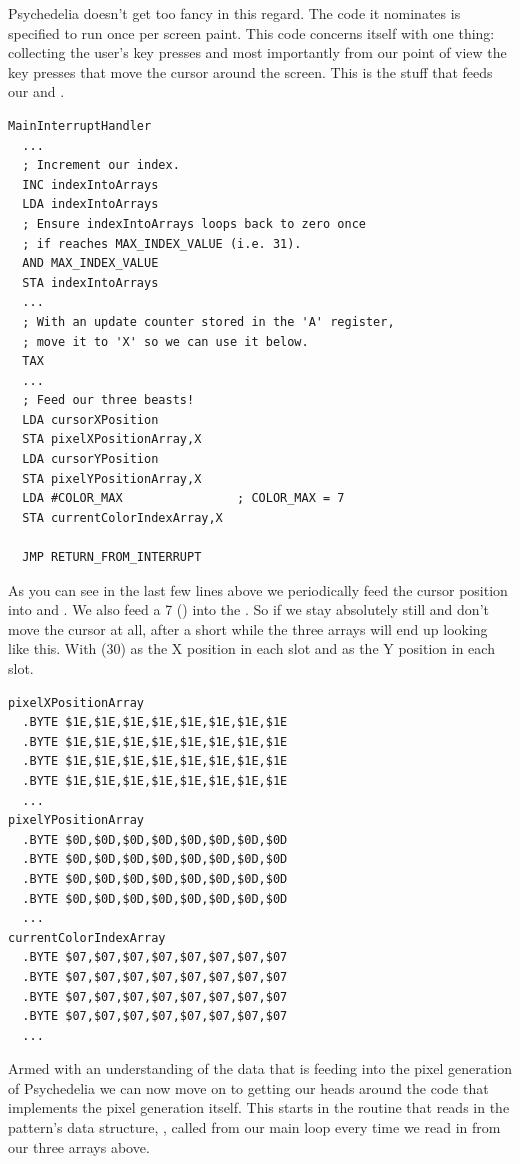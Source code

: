 Psychedelia doesn't get too fancy in this regard. The code it nominates is specified to run once per screen paint. This code concerns itself
with one thing: collecting the user's key presses and most importantly from our point of view the key presses that move the cursor around
the screen. This is the stuff that feeds our  and .

\begin{lstlisting}
MainInterruptHandler   
  ...
  ; Increment our index.
  INC indexIntoArrays
  LDA indexIntoArrays
  ; Ensure indexIntoArrays loops back to zero once
  ; if reaches MAX_INDEX_VALUE (i.e. 31).
  AND MAX_INDEX_VALUE
  STA indexIntoArrays
  ...
  ; With an update counter stored in the 'A' register,
  ; move it to 'X' so we can use it below.
  TAX
  ...
  ; Feed our three beasts!
  LDA cursorXPosition
  STA pixelXPositionArray,X
  LDA cursorYPosition
  STA pixelYPositionArray,X
  LDA #COLOR_MAX                ; COLOR_MAX = 7
  STA currentColorIndexArray,X

  JMP RETURN_FROM_INTERRUPT
\end{lstlisting}

As you can see in the last few lines above we periodically feed the cursor position into  and .
We also feed a 7 () into the . So if we stay absolutely still and don't move the cursor at all, after
a short while the three arrays will end up looking like this. With (30) as the X position in each slot and  as the Y
position in each slot.

\begin{lstlisting}
pixelXPositionArray   
  .BYTE $1E,$1E,$1E,$1E,$1E,$1E,$1E,$1E
  .BYTE $1E,$1E,$1E,$1E,$1E,$1E,$1E,$1E
  .BYTE $1E,$1E,$1E,$1E,$1E,$1E,$1E,$1E
  .BYTE $1E,$1E,$1E,$1E,$1E,$1E,$1E,$1E
  ...
pixelYPositionArray   
  .BYTE $0D,$0D,$0D,$0D,$0D,$0D,$0D,$0D
  .BYTE $0D,$0D,$0D,$0D,$0D,$0D,$0D,$0D
  .BYTE $0D,$0D,$0D,$0D,$0D,$0D,$0D,$0D
  .BYTE $0D,$0D,$0D,$0D,$0D,$0D,$0D,$0D
  ...
currentColorIndexArray   
  .BYTE $07,$07,$07,$07,$07,$07,$07,$07
  .BYTE $07,$07,$07,$07,$07,$07,$07,$07
  .BYTE $07,$07,$07,$07,$07,$07,$07,$07
  .BYTE $07,$07,$07,$07,$07,$07,$07,$07
  ...
\end{lstlisting}

Armed with an understanding of the data that is feeding into the pixel generation of Psychedelia we can now move on to getting our
heads around the code that implements the pixel generation itself. This starts in the routine that reads in the pattern's data
structure, , called from our main loop every time we read in from our three arrays above.



